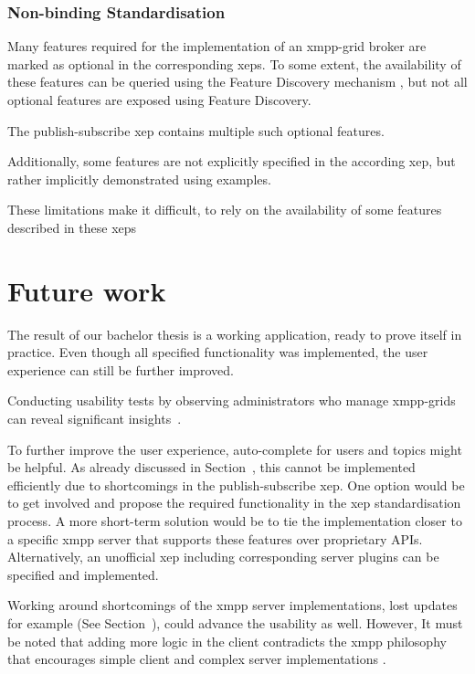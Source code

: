 \subsubsection{Non-binding Standardisation}

Many features required for the implementation of an \gls{xmpp-grid} \gls{broker} are marked as optional in the corresponding \glspl{xep}.
To some extent, the availability of these features can be queried using the Feature Discovery mechanism \cite{xep-0030}, but not all optional features are exposed using Feature Discovery.

The \gls{publish-subscribe} \gls{xep} \cite{xep-0060} contains multiple such optional features.

Additionally, some features are not explicitly specified in the according \gls{xep}, but rather implicitly demonstrated using examples.

These limitations make it difficult, to rely on the availability of some features described in these \glspl{xep}


\section{Future work}
The result of our bachelor thesis is a working application, ready to prove itself in practice.
Even though all specified functionality was implemented, the user experience can still be further improved.

Conducting usability tests by observing administrators who manage \glspl{xmpp-grid} can reveal significant insights~\cite{krug:dont-make-me-think}.

To further improve the user experience, auto-complete for users and topics might be helpful.
As already discussed in Section~, this cannot be implemented efficiently due to shortcomings in the \gls{publish-subscribe} \gls{xep}.
One option would be to get involved and propose the required functionality in the \gls{xep} standardisation process.
A more short-term solution would be to tie the implementation closer to a specific \gls{xmpp} server that supports these features over proprietary APIs.
Alternatively, an unofficial \gls{xep} including corresponding server plugins can be specified and implemented.

Working around shortcomings of the \gls{xmpp} server implementations, lost updates for example (See Section~), could advance the usability as well.
However, It must be noted that adding more logic in the client contradicts the \gls{xmpp} philosophy that encourages simple client and complex server implementations \cite{definitive-guide-xmpp}.

